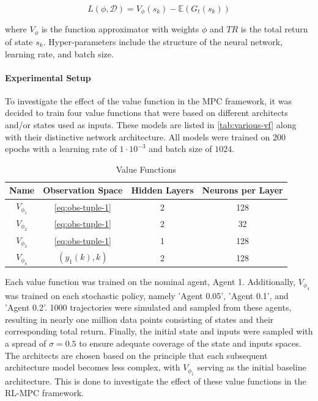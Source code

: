 \begin{equation}\label{eq:vf_tr_loss}
    L(\phi, \mathcal{D}) =   V_{\phi}(s_k) - \mathbb{E}(G_t(s_k))
\end{equation}

where $V_{\phi}$ is the function approximator with weights $\phi$ and $TR$ is the total return of state $s_k$. Hyper-parameters include the structure of the neural network, learning rate, and batch size.\\



\paragraph{Experimental Setup}
To investigate the effect of the value function in the MPC framework, it was decided to train four value functions that were based on different architects and/or states used as inputs. These models are listed in \autoref{tab:various-vf} along with their distinctive network architecture. All models were trained on 200 epochs with a learning rate of $1 \cdot 10^{-3}$ and batch size of $1024$.

\begin{table}[H]
	\centering
	\renewcommand{\arraystretch}{1.3}
	\setlength{\tabcolsep}{12pt}
	\begin{tabular}{cccc}
		\toprule
		\textbf{Name} & \textbf{Observation Space} & \textbf{Hidden Layers} & \textbf{Neurons per Layer} \\
		\midrule
		$V_{\phi_1}$ & \autoref{eq:obs-tuple-1} & 2 & 128 \\  
		$V_{\phi_2}$ & \autoref{eq:obs-tuple-1} & 2 & 32 \\  
		$V_{\phi_3}$ & \autoref{eq:obs-tuple-1} & 1 & 128 \\  
		$V_{\phi_4}$ & $(y_1(k), k)$ & 2 & 128 \\  
		\bottomrule
	\end{tabular}
	\caption{Value Functions}
	\label{tab:various-vf}
\end{table}

Each value function was trained on the nominal agent, Agent 1. Additionally, $V_{\phi_4}$ was trained on each stochastic policy, namely 'Agent 0.05', 'Agent 0.1', and 'Agent 0.2'. 1000 trajectories were simulated and sampled from these agents, resulting in nearly one million data points consisting of states and their corresponding total return. Finally, the initial state and inputs were sampled with a spread of $\sigma = 0.5$ to ensure adequate coverage of the state and inputs spaces. The architects are chosen based on the principle that each subsequent architecture model becomes less complex, with $V_{\phi_1}$ serving as the initial baseline architecture. This is done to investigate the effect of these value functions in the RL-MPC framework.

